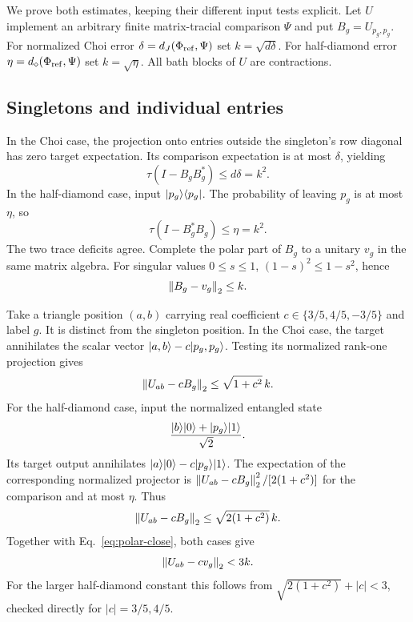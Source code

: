 We prove both estimates, keeping their different input tests explicit. Let $U$ implement an
arbitrary finite matrix-tracial comparison $\Psi$ and put $B_g=U_{p_g,p_g}$.
For normalized Choi error $\delta=d_J(\Phi_{\mathrm{ref}},\Psi)$ set $k=\sqrt{d\delta}$.
For half-diamond error $\eta=d_\diamond(\Phi_{\mathrm{ref}},\Psi)$ set $k=\sqrt\eta$.
All bath blocks of $U$ are contractions.

\subsection{Singletons and individual entries}
In the Choi case, the projection onto entries outside the singleton's row diagonal has
zero target expectation. Its comparison expectation is at most $\delta$, yielding
\begin{equation}
 \tau(I-B_gB_g^*)\le d\delta=k^2.
 \label{eq:polar-choi}
\end{equation}
In the half-diamond case, input $\lvert p_g\rangle\langle p_g\rvert$. The probability of leaving $p_g$
is at most $\eta$, so
\begin{equation}
 \tau(I-B_g^*B_g)\le\eta=k^2.
 \label{eq:polar-diamond}
\end{equation}
The two trace deficits agree. Complete the polar part of $B_g$ to a unitary $v_g$ in the
same matrix algebra. For singular values $0\le s\le1$, $(1-s)^2\le1-s^2$, hence
\begin{equation}
 \left\lVert B_g-v_g\right\rVert_2\le k.
 \label{eq:polar-close}
\end{equation}

Take a triangle position $(a,b)$ carrying real coefficient $c\in\{3/5,4/5,-3/5\}$ and
label $g$. It is distinct from the singleton position. In the Choi case, the target
annihilates the scalar vector $\lvert a,b\rangle-c\lvert p_g,p_g\rangle$. Testing its normalized
rank-one projection gives
\[
 \left\lVert U_{ab}-cB_g\right\rVert_2\le\sqrt{1+c^2}\,k.
\]
For the half-diamond case, input the normalized entangled state
\[
 \frac{\lvert b\rangle\lvert 0\rangle+\lvert p_g\rangle\lvert 1\rangle}{\sqrt2}.
\]
Its target output annihilates $\lvert a\rangle\lvert 0\rangle-c\lvert p_g\rangle\lvert 1\rangle$.
The expectation of the corresponding normalized projector is
$\left\lVert U_{ab}-cB_g\right\rVert_2^2/[2(1+c^2)]$ for the comparison and at most $\eta$.
Thus
\[
 \left\lVert U_{ab}-cB_g\right\rVert_2\le\sqrt{2(1+c^2)}\,k.
\]
Together with Eq.~\eqref{eq:polar-close}, both cases give
\begin{equation}
 \left\lVert U_{ab}-cv_g\right\rVert_2<3k.
 \label{eq:entry-close}
\end{equation}
For the larger half-diamond constant this follows from
$\sqrt{2(1+c^2)}+|c|<3$, checked directly for $|c|=3/5,4/5$.

